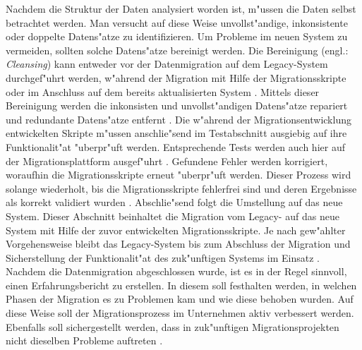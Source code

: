 \lb
Nachdem die Struktur der Daten analysiert worden ist, m"ussen die Daten selbst betrachtet werden. Man versucht auf diese Weise unvollst"andige, inkonsistente oder doppelte Datens"atze zu identifizieren. Um Probleme im neuen System zu vermeiden, sollten solche Datens"atze bereinigt werden. Die Bereinigung (engl.: \textit{ Cleansing}) \cite{hernandez-1998} kann entweder vor der Datenmigration auf dem Legacy-System durchgef"uhrt werden, w"ahrend der Migration mit Hilfe der Migrationsskripte oder im Anschluss auf dem bereits aktualisierten System \citep[S~7f.]{klausMatthesSchulz-2012}. Mittels dieser Bereinigung werden die inkonsisten und unvollst"andigen Datens"atze repariert und redundante Datens"atze entfernt \citep[S.~7f.]{rahm-2010}. 
\lb
Die w"ahrend der Migrationsentwicklung entwickelten Skripte m"ussen anschlie"send im Testabschnitt ausgiebig auf ihre Funktionalit"at "uberpr"uft werden. Entsprechende Tests werden auch hier auf der Migrationsplattform ausgef"uhrt \citep[S.~8f.]{klausMatthesSchulz-2012}. Gefundene Fehler werden korrigiert, woraufhin die Migrationsskripte erneut "uberpr"uft werden. Dieser Prozess wird solange wiederholt, bis die Migrationsskripte fehlerfrei sind und deren Ergebnisse als korrekt validiert wurden \citep[S.~8f.]{klausMatthesSchulz-2012}.
\lb
Abschlie"send folgt die Umstellung auf das neue System. Dieser Abschnitt beinhaltet die Migration vom Legacy- auf das neue System mit Hilfe der zuvor entwickelten Migrationsskripte. Je nach gew"ahlter Vorgehensweise bleibt das Legacy-System bis zum Abschluss der Migration und Sicherstellung der Funktionalit"at des zuk"unftigen Systems im Einsatz \citep[S.~107]{bisbal-1999}. 
\lb
Nachdem die Datenmigration abgeschlossen wurde, ist es in der Regel sinnvoll, einen Erfahrungsbericht zu erstellen. In diesem soll festhalten werden, in welchen Phasen der Migration es zu Problemen kam und wie diese behoben wurden. Auf diese Weise soll der Migrationsprozess im Unternehmen aktiv verbessert werden. Ebenfalls soll sichergestellt werden, dass in zuk"unftigen Migrationsprojekten nicht dieselben Probleme auftreten \citep[S.~10]{klausMatthesSchulz-2012}.


